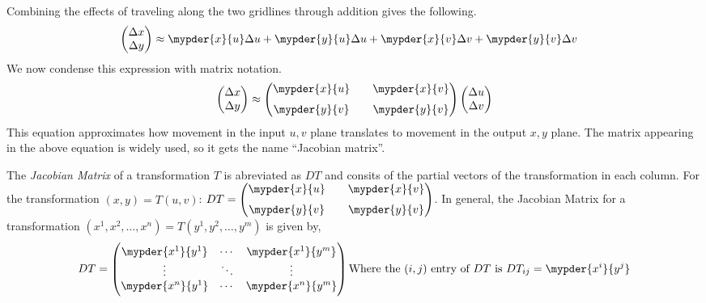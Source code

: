 \documentclass[11pt]{article}
\newenvironment{mybox}
{\begin{tcolorbox}[colback=red!5!white,colframe=red!75!black]}
{\end{tcolorbox}}
\begin{document}
Combining the effects of traveling along the two gridlines through addition gives the following.
\begin{align*}
    \begin{pmatrix} \Delta x \\ \Delta y \end{pmatrix}
    &\approx \mypder{x}{u}\Delta u + \mypder{y}{u}\Delta u
    + \mypder{x}{v}\Delta v + \mypder{y}{v}\Delta v
\end{align*}
We now condense this expression with matrix notation.
\begin{equation}
    \begin{pmatrix} \Delta x \\ \Delta y \end{pmatrix}
    \approx \begin{pmatrix}
    \mypder{x}{u} && \mypder{x}{v} \\[6pt]
    \mypder{y}{v} && \mypder{y}{v}
    \end{pmatrix}
    \begin{pmatrix} \Delta u \\ \Delta v \end{pmatrix}
    \label{eq:linearization}
\end{equation}
This equation approximates how movement in the input $u,v$ plane translates to movement in the output $x,y$ plane. The matrix appearing in the above equation is widely used, so it gets the name ``Jacobian matrix''.
\begin{mybox}
    The \textit{Jacobian Matrix} of a transformation $T$ is abreviated as $DT$ and consits of the partial vectors of the transformation in each column. For the transformation $(x,y) = T(u,v)$:
        $DT = \begin{pmatrix}
        \mypder{x}{u} && \mypder{x}{v} \\[6pt]
        \mypder{y}{v} && \mypder{y}{v}
    \end{pmatrix}$.
    In general, the Jacobian Matrix for a transformation $(x^1,x^2,\ldots,x^n) = T(y^1,y^2,\ldots,y^m)$ is given by,
    \begin{equation*}
    DT = \begin{pmatrix}
        \mypder{x^1}{y^1} & \cdots & \mypder{x^1}{y^m} \\
        \vdots            & \ddots& \vdots\\
        \mypder{x^n}{y^1} & \cdots & \mypder{x^n}{y^m}
    \end{pmatrix}
    \text{Where the $(i,j)$ entry of $DT$ is $DT_{ij} = \mypder{x^i}{y^j}$}
    \end{equation*}
\end{mybox}
\end{document}
